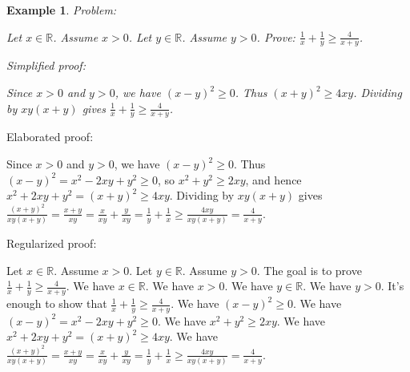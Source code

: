 \documentclass{article}
\newtheorem{example}{Example}
\begin{document}
\begin{example}
Problem:
\begin{tcolorbox}[colback=yellow!10, width=\linewidth]
Let $x\in\mathbb{R}$. Assume $x>0$.
    Let $y\in\mathbb{R}$. Assume $y>0$.
    Prove: $\frac{1}{x} + \frac{1}{y} \ge \frac{4}{x+y}$.
\end{tcolorbox}

Simplified proof:
\begin{tcolorbox}[colback=blue!10, width=\linewidth]
Since $x>0$ and $y>0$, we have $(x-y)^2 \ge 0$. Thus $(x+y)^2 \ge 4xy$. Dividing by $xy(x+y)$ gives $\frac{1}{x}+\frac{1}{y} \ge \frac{4}{x+y}$.
\end{tcolorbox}
\end{example}

Elaborated proof:
\begin{tcolorbox}[colback=green!10, width=\linewidth]
Since $x>0$ and $y>0$, we have $(x-y)^2 \ge 0$. Thus $(x-y)^2 = x^2 -2xy + y^2 \ge 0$, so $x^2 + y^2 \ge 2xy$, and hence $x^2 + 2xy + y^2 = (x+y)^2 \ge 4xy$. Dividing by $xy(x+y)$ gives $\frac{(x+y)^2}{xy(x+y)} = \frac{x+y}{xy} = \frac{x}{xy} + \frac{y}{xy} = \frac{1}{y}+\frac{1}{x} \ge \frac{4xy}{xy(x+y)} = \frac{4}{x+y}$.
\end{tcolorbox}

Regularized proof:
\begin{tcolorbox}[colback=red!10, width=\linewidth]
Let $x\in\mathbb{R}$.
Assume $x>0$.
Let $y\in\mathbb{R}$.
Assume $y>0$.
The goal is to prove $\frac{1}{x} + \frac{1}{y} \ge \frac{4}{x+y}$.
We have $x \in \mathbb{R}$.
We have $x>0$.
We have $y \in \mathbb{R}$.
We have $y>0$.
It's enough to show that $\frac{1}{x} + \frac{1}{y} \ge \frac{4}{x+y}$.
We have ${(x-y)}^2 \ge 0$.
We have ${(x-y)}^2 = x^2 -2xy + y^2 \ge 0$.
We have $x^2 + y^2 \ge 2xy$.
We have $x^2 + 2xy + y^2 = {(x+y)}^2 \ge 4xy$.
We have $\frac{{(x+y)}^2}{xy(x+y)} = \frac{x+y}{xy} = \frac{x}{xy} + \frac{y}{xy} = \frac{1}{y}+\frac{1}{x} \ge \frac{4xy}{xy(x+y)} = \frac{4}{x+y}$.
\end{tcolorbox}
\end{document}
